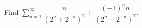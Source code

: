 Find $\displaystyle \sum_{n=1}^\infty \dfrac{n}{(2^n + 2^{-n})^2} +
                                      \dfrac{(-1)^n n}{(2^n - 2^{-n})^2}$.
